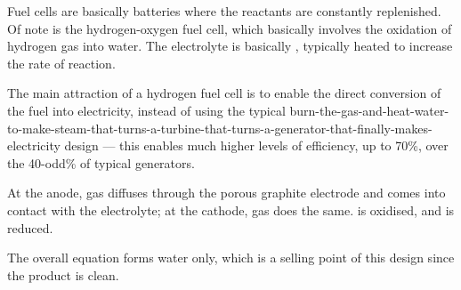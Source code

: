 			Fuel cells are basically batteries where the reactants are constantly replenished. Of note is the hydrogen-oxygen fuel cell,
			which basically involves the oxidation of hydrogen gas into water. The electrolyte is basically , typically heated
			to increase the rate of reaction.

			The main attraction of a hydrogen fuel cell is to enable the direct conversion of the  fuel into electricity, instead
			of using the typical burn-the-gas-and-heat-water-to-make-steam-that-turns-a-turbine-that-turns-a-generator-that-finally-makes-electricity design --- this enables much higher levels of efficiency, up to 70\%, over the 40-odd\% of typical generators.


			At the anode,  gas diffuses through the porous graphite electrode and comes into contact with the  electrolyte; at
			the cathode,  gas does the same.  is oxidised, and  is reduced.

			The overall equation forms water only, which is a selling point of this design since the product is clean.







































